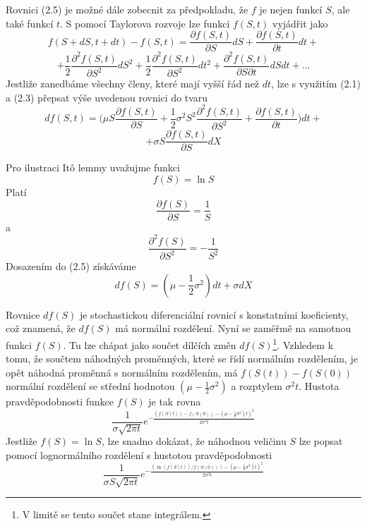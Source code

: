 \documentclass[a4paper]{book}
\begin{document}
Rovnici (2.5) je možné dále zobecnit za předpokladu, že $f$ je nejen funkcí $S$, ale také funkcí $t$. S pomocí Taylorova rozvoje lze funkci $f(S,t)$ vyjádřit jako
\begin{equation*}
f(S + dS, t + dt) - f(S,t) = \frac{\partial f(S,t)}{\partial S}dS +  \frac{\partial f(S,t)}{\partial t}dt + 
\end{equation*}
\begin{equation*}
+ \frac{1}{2}\frac{\partial^2 f(S,t)}{\partial S^2}dS^2 + \frac{1}{2}\frac{\partial^2 f(S,t)}{\partial S^2}dt^2 + \frac{\partial^2 f(S,t)}{\partial S \partial t}dSdt + ...
\end{equation*}
Jestliže zanedbáme všechny členy, které mají vyšší řád než $dt$, lze s využitím (2.1) a (2.3) přepsat výše uvedenou rovnici do tvaru
\begin{equation}
df(S,t) = \Big(\mu S \frac{\partial f(S,t)}{\partial S} + \frac{1}{2}\sigma^2S^2\frac{\partial^2 f(S,t)}{\partial S^2} + \frac{\partial f(S,t)}{\partial t} \Big)dt +
\end{equation}
\begin{equation*}
+ \sigma S \frac{\partial f(S,t)}{\partial S}dX
\end{equation*}

Pro ilustraci It\^o lemmy uvažujme funkci
\begin{equation*}
f(S) = \ln S
\end{equation*}
Platí
\begin{equation*}
\frac{\partial f(S)}{\partial S} = \frac{1}{S}
\end{equation*}
a
\begin{equation*}
\frac{\partial^2 f(S)}{\partial S^2} = -\frac{1}{S^2}
\end{equation*}
Dosazením do (2.5) získáváme
\begin{equation*}
df(S)=(\mu - \frac{1}{2}\sigma^2)dt + \sigma dX
\end{equation*}

Rovnice $df(S)$ je stochastickou diferenciální rovnicí s konstatními koeficienty, což znamená, že $df(S)$ má normální rozdělení. Nyní se zaměřmě na samotnou funkci $f(S)$. Tu lze chápat jako součet dílčích změn $df(S)$\footnote{V limitě se tento součet stane integrálem.}. Vzhledem k tomu, že součtem náhodných proměnných, které se řídí normálním rozdělením, je opět náhodná proměnná s normálním rozdělením, má $f(S(t))-f(S(0))$ normální rozdělení se střední hodnotou $(\mu - \frac{1}{2}\sigma^2)$ a rozptylem $\sigma^2t$. Hustota pravděpodobnosti funkce $f(S)$ je tak rovna
\begin{equation}
\frac{1}{\sigma \sqrt{2 \pi t}}e^{-\frac{(f(S(t))-f(S(0))-(\mu - \frac{1}{2}\sigma^2)t)^2}{2 \sigma^2 t}}
\end{equation}
Jestliže $f(S) = \ln S$, lze snadno dokázat, že náhodnou veličinu $S$ lze popsat pomocí lognormálního rozdělení s hustotou pravděpodobnosti
\begin{equation*}
\frac{1}{\sigma S\sqrt{2 \pi t}}e^{-\frac{(\ln (f(S(t))/f(S(0)))-(\mu - \frac{1}{2}\sigma^2)t)^2}{2 \sigma^2 t}}
\end{equation*}
\end{document}
